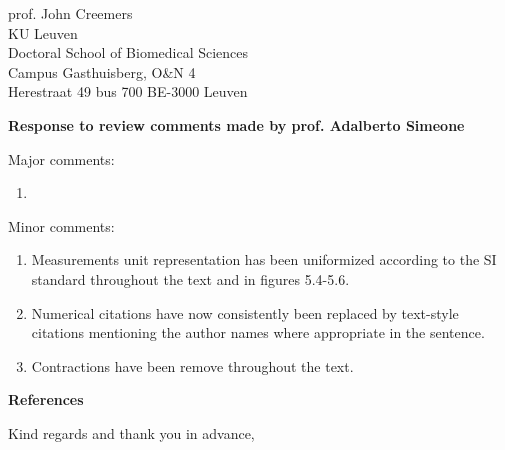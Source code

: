 \documentclass{letter}
\newcommand{\reply}[1]{%
	\textbf{Response to review comments made by prof. #1}

}
\begin{document}
\begin{letter}{
	prof. John Creemers \\
	KU Leuven \\
	Doctoral School of Biomedical Sciences \\
	Campus Gasthuisberg, O\&N 4 \\
	Herestraat 49 bus 700
	BE-3000 Leuven

}
\reply{Adalberto Simeone}
Major comments:
\begin{enumerate}
	\item {}
\end{enumerate}
Minor comments:
\begin{enumerate}
	\item Measurements unit representation has been uniformized according to the
    SI standard throughout the text and in figures 5.4-5.6.
  \item Numerical citations have now consistently been replaced by text-style citations
    mentioning the author names where appropriate in the sentence.
  \item Contractions have been remove throughout the text.
\end{enumerate}


\textbf{References}

\printbibliography[heading=none]

\closing{Kind regards and thank you in advance,}
\end{letter}
\end{document}
